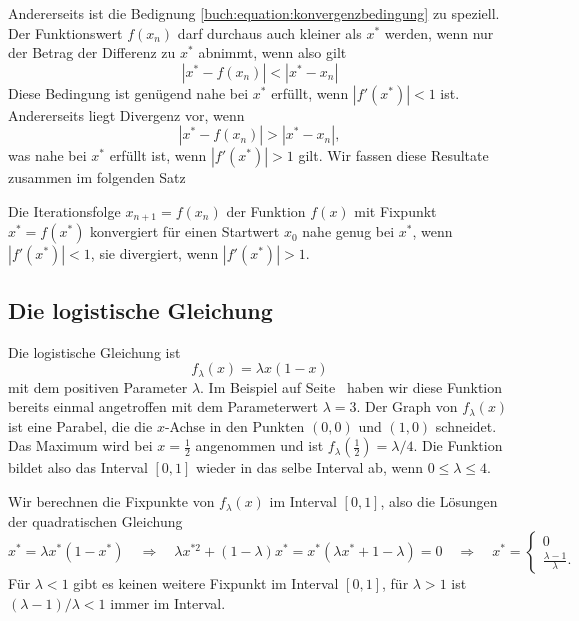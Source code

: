 Andererseits ist die Bedignung \ref{buch:equation:konvergenzbedingung}
zu speziell.
Der Funktionswert $f(x_n)$ darf durchaus auch kleiner als $x^*$ werden,
wenn nur der Betrag der Differenz zu $x^*$ abnimmt, wenn also gilt
\begin{equation}
|x^* - f(x_n)| < |x^*-x_n|
\label{buch:equation:konvergenzbereich}
\end{equation}
Diese Bedingung ist genügend nahe bei $x^*$ erfüllt, wenn
$|f'(x^*)| < 1$ ist.
Andererseits liegt Divergenz vor, wenn 
\[
|x^* - f(x_n)| > |x^*-x_n|,
\]
was nahe bei $x^*$ erfüllt ist, wenn $|f'(x^*)|>1$ gilt.
Wir fassen diese Resultate zusammen im folgenden Satz

\begin{satz}
\label{buch:satz:konvergenzkriterium}
Die Iterationsfolge $x_{n+1}=f(x_n)$ der Funktion $f(x)$ mit Fixpunkt
$x^*=f(x^*)$ konvergiert für einen Startwert $x_0$ nahe genug bei $x^*$,
wenn $|f'(x^*)|<1$, sie divergiert, wenn $|f'(x^*)|>1$.
\end{satz}

%
%
\subsection{Die logistische Gleichung
\label{buch:subsection:logistisch}}
Die logistische Gleichung ist 
\[
f_\lambda(x) = \lambda x(1-x)
\]
mit dem positiven Parameter $\lambda$.
Im Beispiel auf Seite~\pageref{buch:beispiel:logistisch3} haben wir
diese Funktion bereits einmal angetroffen mit dem Parameterwert
$\lambda=3$.
Der Graph von $f_\lambda(x)$ ist eine Parabel, die die $x$-Achse
in den Punkten $(0,0)$ und $(1,0)$ schneidet.
Das Maximum wird bei $x=\frac12$ angenommen und ist
$f_\lambda(\frac12)=\lambda/4$.
Die Funktion bildet also das Interval $[0,1]$ wieder in das selbe Interval
ab, wenn $0\le \lambda\le 4$.

Wir berechnen die Fixpunkte von $f_\lambda(x)$ im Interval $[0,1]$, also
die Lösungen der quadratischen Gleichung
\[
x^*  = \lambda x^* (1-x^*)
\quad\Rightarrow\quad
\lambda x^{*2} +(1-\lambda)x^*
=
x^* (\lambda x^* + 1-\lambda) 
=0
\quad\Rightarrow\quad
x^*
=
\begin{cases}
0&\\
\displaystyle \frac{\lambda-1}{\lambda}.&
\end{cases}
\]
Für $\lambda<1$ gibt es keinen weitere Fixpunkt im Interval $[0,1]$, für
$\lambda>1$ ist $(\lambda-1)/\lambda<1$ immer im Interval.

